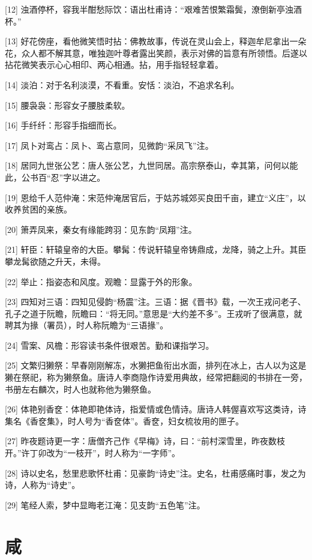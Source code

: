 \documentclass[12pt,UTF8]{ctexbook}
\begin{document}
[12] 浊酒停杯，容我半酣愁际饮：语出杜甫诗：“艰难苦恨繁霜鬓，潦倒新亭浊酒杯。”

[13] 好花傍座，看他微笑悟时拈：佛教故事，传说在灵山会上，释迦牟尼拿出一朵花，众人都不解其意，唯独迦叶尊者露出笑颜，表示对佛的旨意有所领悟。后遂以拈花微笑表示心心相印、两心相通。拈，用手指轻轻拿着。

[14] 淡泊：对于名利淡漠，不看重。安恬：淡泊，不追求名利。

[15] 腰袅袅：形容女子腰肢柔软。

[16] 手纤纤：形容手指细而长。

[17] 凤卜对鸾占：凤卜、鸾占意同，见微韵“采凤飞”注。

[18] 居同九世张公艺：唐人张公艺，九世同居。高宗祭泰山，幸其第，问何以能此，公书百“忍”字以进之。

[19] 恩给千人范仲淹：宋范仲淹居官后，于姑苏城郊买良田千亩，建立“义庄”，以收养贫困的亲族。

[20] 箫弄凤来，秦女有缘能跨羽：见东韵“凤翔”注。

[21] 轩臣：轩辕皇帝的大臣。攀髯：传说轩辕皇帝铸鼎成，龙降，骑之上升。其臣攀龙髯欲随之升天，未得。

[22] 举止：指姿态和风度。观瞻：显露于外的形象。

[23] 四知对三语：四知见侵韵“杨震”注。三语：据《晋书》载，一次王戎问老子、孔子之道于阮瞻，阮瞻曰：“将无同。”意思是“大约差不多”。王戎听了很满意，就聘其为掾（署员），时人称阮瞻为“三语掾”。

[24] 雪案、风檐：形容读书条件很艰苦。勤和课指学习。

[25] 文繁归獭祭：早春刚刚解冻，水獭把鱼衔出水面，排列在冰上，古人以为这是獭在祭祀，称为獭祭鱼。唐诗人李商隐作诗爱用典故，经常把翻阅的书排在一旁，书册左右麟次，时人也就称他为獭祭鱼。

[26] 体艳别香奁：体艳即艳体诗，指爱情或色情诗。唐诗人韩偓喜欢写这类诗，诗集名《香奁集》，时人号为“香奁体”。香奁，妇女梳妆用的匣子。

[27] 昨夜题诗更一字：唐僧齐己作《早梅》诗，曰：“前村深雪里，昨夜数枝开。”许丁卯改为“一枝开”，时人称为“一字师”。

[28] 诗以史名，愁里悲歌怀杜甫：见豪韵“诗史”注。史名，杜甫感痛时事，发之为诗，人称为“诗史”。

[29] 笔经人索，梦中显晦老江淹：见支韵“五色笔”注。





\chapter{咸}
\end{document}
